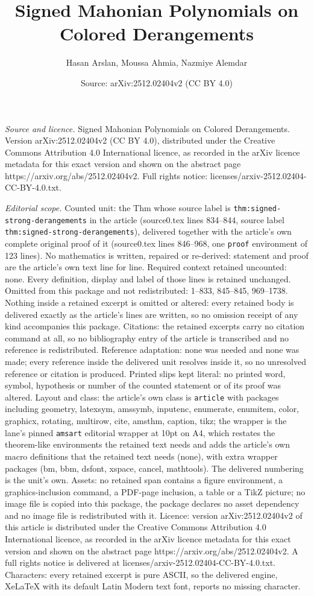 \documentclass[10pt,a4paper]{amsart}
\title[Signed Mahonian Polynomials on Colored Derangements]{Signed Mahonian Polynomials on Colored Derangements}
\author{Hasan Arslan, Moussa Ahmia, Nazmiye Alemdar}
\date{Source: arXiv:2512.02404v2 (CC BY 4.0)}
\begin{document}
\maketitle

\noindent\emph{Source and licence.} Signed Mahonian Polynomials on Colored Derangements. Version arXiv:2512.02404v2 (CC BY 4.0), distributed under the Creative Commons Attribution 4.0 International licence, as recorded in the arXiv licence metadata for this exact version and shown on the abstract page https://arxiv.org/abs/2512.02404v2. Full rights notice: licenses/arxiv-2512.02404-CC-BY-4.0.txt.\par\smallskip

\noindent\textit{Editorial scope.} Counted unit: the Thm whose source label is \texttt{thm:signed-strong-derangements} in the article (source0.tex lines 834--844, source label \texttt{thm:signed-strong-derangements}), delivered together with the article's own complete original proof of it (source0.tex lines 846--968, one \texttt{proof} environment of 123 lines). No mathematics is written, repaired or re-derived: statement and proof are the article's own text line for line. Required context retained uncounted: none. Every definition, display and label of those lines is retained unchanged. Omitted from this package and not redistributed: 1--833, 845--845, 969--1738. Nothing inside a retained excerpt is omitted or altered: every retained body is delivered exactly as the article's lines are written, so no omission receipt of any kind accompanies this package. Citations: the retained excerpts carry no citation command at all, so no bibliography entry of the article is transcribed and no reference is redistributed. Reference adaptation: none was needed and none was made; every reference inside the delivered unit resolves inside it, so no unresolved reference or citation is produced. Printed slips kept literal: no printed word, symbol, hypothesis or number of the counted statement or of its proof was altered. Layout and class: the article's own class is \texttt{article} with packages including geometry, latexsym, amssymb, inputenc, enumerate, enumitem, color, graphicx, rotating, multirow, cite, amsthm, caption, tikz; the wrapper is the lane's pinned \texttt{amsart} editorial wrapper at 10pt on A4, which restates the theorem-like environments the retained text needs and adds the article's own macro definitions that the retained text needs (none), with extra wrapper packages (bm, bbm, dsfont, xspace, cancel, mathtools). The delivered numbering is the unit's own. Assets: no retained span contains a figure environment, a graphics-inclusion command, a PDF-page inclusion, a table or a TikZ picture; no image file is copied into this package, the package declares no asset dependency and no image file is redistributed with it. Licence: version arXiv:2512.02404v2 of this article is distributed under the Creative Commons Attribution 4.0 International licence, as recorded in the arXiv licence metadata for this exact version and shown on the abstract page https://arxiv.org/abs/2512.02404v2. A full rights notice is delivered at licenses/arxiv-2512.02404-CC-BY-4.0.txt. Characters: every retained excerpt is pure ASCII, so the delivered engine, XeLaTeX with its default Latin Modern text font, reports no missing character.
\end{document}
